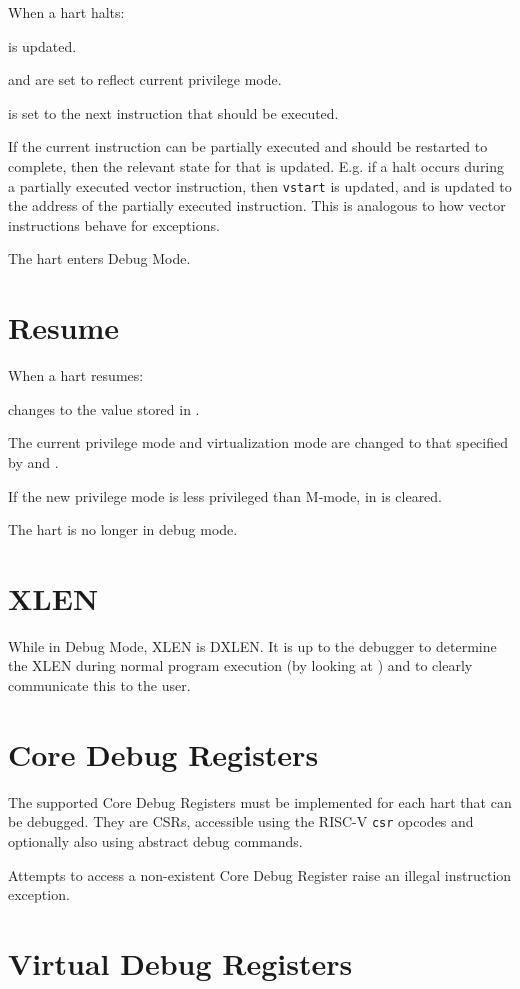 \begin{steps}{When a hart halts:}
    \item \FcsrDcsrCause is updated.
    \item \FcsrDcsrPrv and \FcsrDcsrV are set to reflect current privilege mode.
    \item \RcsrDpc is set to the next instruction that should be executed.
    \item If the current instruction can be partially executed and should be
        restarted to complete, then the relevant state for that is updated. E.g.
        if a halt occurs during a partially executed vector instruction, then
        {\tt vstart} is updated, and \RcsrDpc is updated to the address of the
        partially executed instruction. This is analogous to how vector
        instructions behave for exceptions.
    \item The hart enters Debug Mode.
\end{steps}

\section{Resume}

\begin{steps}{When a hart resumes:}
    \item \Rpc changes to the value stored in \RcsrDpc.
    \item The current privilege mode and virtualization mode are changed to that specified by
        \FcsrDcsrPrv and \FcsrDcsrV.
    \item If the new privilege mode is less privileged than M-mode,
        \FcsrMstatusMprv in \Rmstatus is cleared.
    \item The hart is no longer in debug mode.
\end{steps}

\section{XLEN}

While in Debug Mode, XLEN is DXLEN. It is up to the debugger to determine the
XLEN during normal program execution (by looking at \Rmisa) and to clearly
communicate this to the user.

\section{Core Debug Registers} \label{debreg}

The supported Core Debug Registers must be implemented for each hart that can
be debugged. They are CSRs, accessible using the RISC-V {\tt csr} opcodes and
optionally also using abstract debug commands.

Attempts to access a non-existent Core Debug Register raise an illegal
instruction exception.



\section{Virtual Debug Registers} \label{virtreg}


